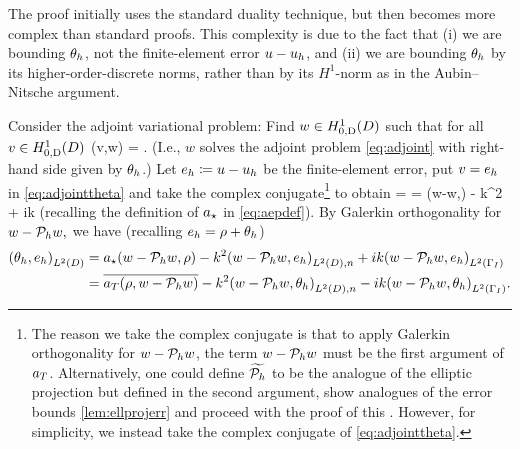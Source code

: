 The proof initially uses the standard duality technique, but then becomes more complex than standard proofs. This complexity is due to the fact that (i) we are bounding $\theta_{h}$, not the finite-element error $u-u_{h}$, and (ii) we are bounding $\theta_{h}$ by its higher-order-discrete norms, rather than by its $H^1$-norm as in the Aubin--Nitsche argument.

Consider the adjoint variational problem: Find $w \in \HozDD$ such that for all $v \in \HozDD$
\beq\label{eq:adjointtheta}
\aT(v,w) = .
\eeq
(I.e., $w$ solves the adjoint problem \cref{eq:adjoint} with right-hand side given by $\theta_{h}$.) Let $e_{h} \coloneqq u -u_{h}$ be the finite-element error, put $v = e_{h}$ in \cref{eq:adjointtheta} and take the complex conjugate\footnote{The reason we take the complex conjugate is that to apply Galerkin orthogonality for $w-\mathcal P_{h} w$, the term $w-\mathcal P_{h} w$ must be the first argument of $a_{T}$. Alternatively, one could define $\widetilde{\mathcal P_{h}}$ to be the analogue of the elliptic projection but defined in the second argument, show analogues of the error bounds \cref{lem:ellprojerr} and proceed with the proof of this . However, for simplicity, we instead take the complex conjugate of \cref{eq:adjointtheta}.} to obtain
\beqs
\IPLtD{\thetah}{\eh} =  = \aep(w-\Ph w,\eh) - k^2  + ik 
\eeqs
(recalling the definition of $a_{\star}$ in \cref{eq:aepdef}). By Galerkin orthogonality for $w-\mathcal P_{h} w,$ we have (recalling $e_{h} = \rho + \theta_{h}$)
\begin{align}
  \IPLtD{\thetah}{\eh} &= \aep(w-\Ph w,\rho) - k^2 \IPLtDn{w-\Ph w}{\eh} + ik \IPLtGI{w - \Ph w}{\eh}\nonumber\\
&= \overline{\aT(\rho,w-\Ph w)}  -k^2 \IPLtDn{w-\Ph w}{\thetah} -ik \IPLtGI{w-\Ph w}{\thetah}.\label{eq:doublego}
\end{align}

